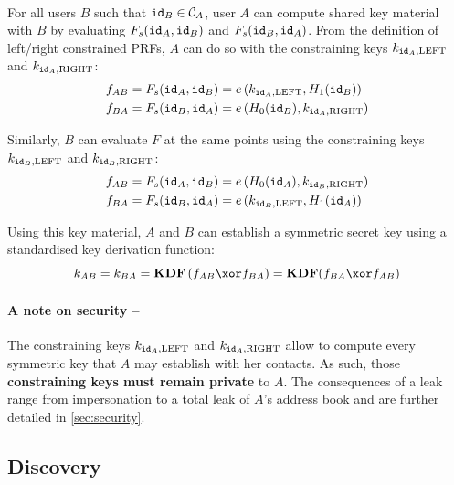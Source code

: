 		\paragraph{} For all users $B$ such that $\mathtt{id}_B \in \mathcal{C}_A$, user $A$ can compute shared key material with $B$ by evaluating $F_s(\mathtt{id}_A, \mathtt{id}_B)$ and $F_s(\mathtt{id}_B, \mathtt{id}_A)$. From the definition of left/right constrained PRFs, $A$ can do so with the constraining keys $k_{\mathtt{id}_A,\mathrm{LEFT}}$ and $k_{\mathtt{id}_A,\mathrm{RIGHT}}$:
		\begin{align}
			f_{AB} = F_s(\mathtt{id}_A, \mathtt{id}_B) &= e\left(k_{\mathtt{id}_A,\mathrm{LEFT}}, H_1(\mathtt{id}_B) \right) \\
			f_{BA} = F_s(\mathtt{id}_B, \mathtt{id}_A) &= e\left(H_0(\mathtt{id}_B), k_{\mathtt{id}_A,\mathrm{RIGHT}} \right)
		\end{align} 
	
	\noindent Similarly, $B$ can evaluate $F$ at the same points using the constraining keys $k_{\mathtt{id}_B,\mathrm{LEFT}}$ and $k_{\mathtt{id}_B,\mathrm{RIGHT}}$:		
		\begin{align}
			f_{AB} = F_s(\mathtt{id}_A, \mathtt{id}_B) &= e\left(H_0(\mathtt{id}_A), k_{\mathtt{id}_B,\mathrm{RIGHT}} \right) \\
			f_{BA} = F_s(\mathtt{id}_B, \mathtt{id}_A) &= e\left(k_{\mathtt{id}_B,\mathrm{LEFT}}, H_1(\mathtt{id}_A) \right) 
		\end{align}
	
\noindent Using this key material, $A$ and $B$ can establish a symmetric secret key using a standardised key derivation function:
	\begin{equation}
		k_{AB} = k_{BA} = \mathbf{KDF}\left(f_{AB} \xor f_{BA}\right) = \mathbf{KDF}(f_{BA} \xor f_{AB})
	\end{equation}
	
	\paragraph{A note on security --} The constraining keys $k_{\mathtt{id}_A,\mathrm{LEFT}}$ and $k_{\mathtt{id}_A,\mathrm{RIGHT}}$ allow to compute every symmetric key that $A$ may establish with her contacts. As such, those \textbf{constraining keys must remain private} to $A$. The consequences of a leak range from impersonation to a total leak of $A$'s address book and are further detailed in \autoref{sec:security}.
	
	\subsection{Discovery}
	
